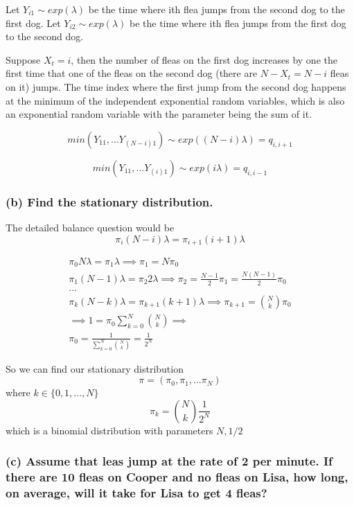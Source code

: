 \documentclass[]{article}
\begin{document}
Let \(Y_{i1} \sim exp(\lambda)\) be the time where ith flea jumps from
the second dog to the first dog. Let \(Y_{i2} \sim exp(\lambda)\) be the
time where ith flea jumps from the first dog to the second dog.

Suppose \(X_t = i\), then the number of fleas on the first dog increases
by one the first time that one of the fleas on the second dog (there are
\(N-X_t = N-i\) fleas on it) jumps. The time index where the first jump
from the second dog happens at the minimum of the independent
exponential random variables, which is also an exponential random
variable with the parameter being the sum of it.

\[
min(Y_{11},... Y_{(N-i)1}) \sim exp((N-i) \lambda ) = q_{i, i+1}
\]

\[
min(Y_{11},... Y_{(i)1}) \sim exp(i\lambda) = q_{i, i-1}
\]

\hypertarget{b-find-the-stationary-distribution.}{%
\subsubsection{(b) Find the stationary
distribution.}\label{b-find-the-stationary-distribution.}}

The detailed balance question would be \[
\pi_i (N-i)\lambda = \pi_{i+1} (i+1) \lambda
\]

\[
\begin{array}{c}
\pi_0 N \lambda = \pi_1 \lambda \implies \pi_1 = N \pi_0  \\
\pi_1 (N-1) \lambda = \pi_2 2\lambda \implies \pi_2 = \frac{N-1}{2} \pi_1 =  \frac{N(N-1)}{2} \pi_0 \\
...\\
\pi_k (N-k) \lambda = \pi_{k+1} (k+1)\lambda \implies \pi_{k+1} = {N\choose k} \pi_0  \\
\implies 1 = \pi_0 \sum_{k=0}^N {N\choose k}  \implies 
\\ \pi_0 = \frac{1}{\sum_{k=0}^N {N\choose k} } = \frac{1}{2^N}
\end{array}
\]

So we can find our stationary distribution \[
\pi =(\pi_0, \pi_1, ... \pi_N)
\] where \(k \in \{0, 1, ..., N\}\) \[
\pi_k = {N \choose k} \frac{1}{2^N}
\] which is a binomial distribution with parameters \(N, 1/2\)

\hypertarget{c-assume-that-leas-jump-at-the-rate-of-2-per-minute.-if-there-are-10-fleas-on-cooper-and-no-fleas-on-lisa-how-long-on-average-will-it-take-for-lisa-to-get-4-fleas}{%
\subsubsection{(c) Assume that leas jump at the rate of 2 per minute. If
there are 10 fleas on Cooper and no fleas on Lisa, how long, on average,
will it take for Lisa to get 4
fleas?}\label{c-assume-that-leas-jump-at-the-rate-of-2-per-minute.-if-there-are-10-fleas-on-cooper-and-no-fleas-on-lisa-how-long-on-average-will-it-take-for-lisa-to-get-4-fleas}}
\end{document}
